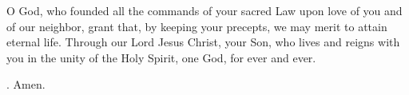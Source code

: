 \lettrine[lines=3]{O}{} God, who founded all the commands of your sacred Law upon love of you and of our neighbor, grant that, by keeping your precepts, we may merit to attain eternal life. Through our Lord Jesus Christ, your Son, who lives and reigns with you in the unity of the Holy Spirit, one God, for ever and ever. \par \Rbar. Amen.
